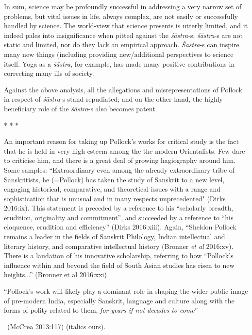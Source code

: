 In sum, science may be profoundly successful in addressing a very narrow set of problems, but vital issues in life, always complex, are not easily or successfully handled by science. The world-view that science presents is utterly limited, and it indeed pales into insignificance when pitted against the \textit{śāstra}-s; \textit{śāstra}-s are not static and limited, nor do they lack an empirical approach. \textit{Śāstra}-s can inspire many new things (including providing new/additional perspectives to science itself. Yoga as a \textit{śāstra}, for example, has made many positive contributions in correcting many ills of society.

Against the above analysis, all the allegations and misrepresentations of Pollock in respect of \textit{śāstra}-s stand repudiated; and on the other hand, the highly beneficiary role of the \textit{śāstra}-s also becomes patent.

\begin{center}
* * *
\end{center}

\vskip -7pt

An important reason for taking up Pollock’s works for critical study is the fact that he is held in very high esteem among the the modern Orientalists. Few dare to criticise him, and there is a great deal of growing hagiography around him. Some samples: “Extraordinary even among the already extraordinary tribe of Sanskritists, he (=Pollock) has taken the study of Sanskrit to a new level, engaging historical, comparative, and theoretical issues with a range and sophistication that is unusual and in many respects unprecedented" (Dirks 2016:ix). This statement is preceded by a reference to his “scholarly breadth, erudition, originality and commitment”, and succeeded by a reference to “his eloquence, erudition and efficiency” (Dirks 2016:xiii). Again, “Sheldon Pollock remains a leader in the fields of Sanskrit Philology, Indian intellectual and literary history, and comparative intellectual history (Bronner \textit{et al} 2016:xv). There is a laudation of his innovative scholarship, referring to how “Pollock’s influence within and beyond the field of South Asian studies has risen to new heights...”  (Bronner et al 2016:xxi)


\begin{myquote}
“Pollock’s work will likely play a dominant role in shaping the wider public image of pre-modern India, especially Sanskrit, language and culture along with the forms of polity related to them, \textit{for years if not decades to come}” 

~\hfill (McCrea 2013:117) (italics ours).
\end{myquote}

